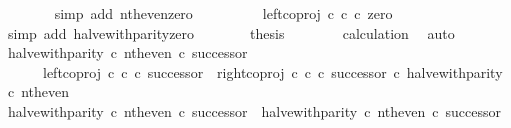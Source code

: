 \begin{isabellebody}
\ \ \ \ \ \ \isamarkupfalse%
\ {\isacharparenleft}{\kern0pt}simp\ add{\isacharcolon}{\kern0pt}\ nth{\isacharunderscore}{\kern0pt}even{\isacharunderscore}{\kern0pt}zero{\isacharparenright}{\kern0pt}\isanewline
\ \ \ \ \isamarkupfalse%
\ \isamarkupfalse%
\ {\isachardoublequoteopen}{\isachardot}{\kern0pt}{\isachardot}{\kern0pt}{\isachardot}{\kern0pt}\ {\isacharequal}{\kern0pt}\ left{\isacharunderscore}{\kern0pt}coproj\ {\isasymnat}\isactrlsub c\ {\isasymnat}\isactrlsub c\ {\isasymcirc}\isactrlsub c\ zero{\isachardoublequoteclose}\isanewline
\ \ \ \ \ \ \isamarkupfalse%
\ {\isacharparenleft}{\kern0pt}simp\ add{\isacharcolon}{\kern0pt}\ halve{\isacharunderscore}{\kern0pt}with{\isacharunderscore}{\kern0pt}parity{\isacharunderscore}{\kern0pt}zero{\isacharparenright}{\kern0pt}\isanewline
\ \ \ \ \isamarkupfalse%
\ \isamarkupfalse%
\ {\isacharquery}{\kern0pt}thesis\isanewline
\ \ \ \ \ \ \isamarkupfalse%
\ calculation\ \isamarkupfalse%
\ auto\isanewline
\ \ \isamarkupfalse%
\isanewline
\isanewline
\ \ \isamarkupfalse%
\ {\isachardoublequoteopen}{\isacharparenleft}{\kern0pt}halve{\isacharunderscore}{\kern0pt}with{\isacharunderscore}{\kern0pt}parity\ {\isasymcirc}\isactrlsub c\ nth{\isacharunderscore}{\kern0pt}even{\isacharparenright}{\kern0pt}\ {\isasymcirc}\isactrlsub c\ successor\ {\isacharequal}{\kern0pt}\isanewline
\ \ \ \ \ \ {\isacharparenleft}{\kern0pt}{\isacharparenleft}{\kern0pt}left{\isacharunderscore}{\kern0pt}coproj\ {\isasymnat}\isactrlsub c\ {\isasymnat}\isactrlsub c\ {\isasymcirc}\isactrlsub c\ successor{\isacharparenright}{\kern0pt}\ {\isasymamalg}\ {\isacharparenleft}{\kern0pt}right{\isacharunderscore}{\kern0pt}coproj\ {\isasymnat}\isactrlsub c\ {\isasymnat}\isactrlsub c\ {\isasymcirc}\isactrlsub c\ successor{\isacharparenright}{\kern0pt}{\isacharparenright}{\kern0pt}\ {\isasymcirc}\isactrlsub c\ halve{\isacharunderscore}{\kern0pt}with{\isacharunderscore}{\kern0pt}parity\ {\isasymcirc}\isactrlsub c\ nth{\isacharunderscore}{\kern0pt}even{\isachardoublequoteclose}\isanewline
\ \ \isamarkupfalse%
\ {\isacharminus}{\kern0pt}\isanewline
\ \ \ \ \isamarkupfalse%
\ {\isachardoublequoteopen}{\isacharparenleft}{\kern0pt}halve{\isacharunderscore}{\kern0pt}with{\isacharunderscore}{\kern0pt}parity\ {\isasymcirc}\isactrlsub c\ nth{\isacharunderscore}{\kern0pt}even{\isacharparenright}{\kern0pt}\ {\isasymcirc}\isactrlsub c\ successor\ {\isacharequal}{\kern0pt}\ halve{\isacharunderscore}{\kern0pt}with{\isacharunderscore}{\kern0pt}parity\ {\isasymcirc}\isactrlsub c\ nth{\isacharunderscore}{\kern0pt}even\ {\isasymcirc}\isactrlsub c\ successor{\isachardoublequoteclose}\isanewline

\end{isabellebody}
